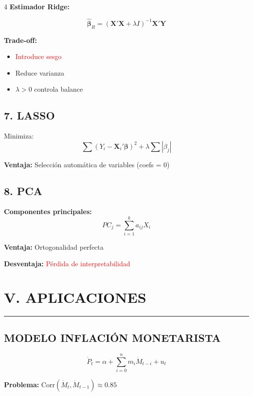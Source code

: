 \documentclass[6pt, landscape]{extarticle}
\newcommand{\sectionline}{%
  \nopagebreak\vspace{-4pt}\noindent\textcolor{GoldLeaf}{\rule{\linewidth}{1pt}}\par\vspace{2pt}%
}
\newcommand{\Xmat}{\mathbf{X}}
\newcommand{\Ymat}{\mathbf{Y}}
\newcommand{\betahat}{\hat{\boldsymbol{\beta}}}
\begin{document}
\begin{multicols*}{4}
\textbf{Estimador Ridge:}
\begin{formulabox}
\vspace{-3pt}
$$\betahat_R = (\Xmat'\Xmat + \lambda I)^{-1}\Xmat'\Ymat$$
\vspace{-3pt}
\end{formulabox}

\textbf{Trade-off:}
\begin{itemize}
    \item \textcolor{red}{Introduce sesgo}
    \item \textcolor{OliveGreen}{Reduce varianza}
    \item $\lambda > 0$ controla balance
\end{itemize}

\subsection{7. LASSO}

Minimiza:
$$\sum (Y_i - \Xmat_i'\boldsymbol{\beta})^2 + \lambda \sum |\beta_j|$$

\textbf{Ventaja:} Selección automática de variables (coefs = 0)

\subsection{8. PCA}

\textbf{Componentes principales:}
$$PC_j = \sum_{i=1}^k a_{ij} X_i$$

\textbf{Ventaja:} Ortogonalidad perfecta

\textbf{Desventaja:} \textcolor{red}{Pérdida de interpretabilidad}

\section{V. APLICACIONES}
\sectionline

\subsection{MODELO INFLACIÓN MONETARISTA}

\begin{formulabox}
\vspace{-3pt}
$$\dot{P}_t = \alpha + \sum_{i=0}^n m_i \dot{M}_{t-i} + u_t$$
\vspace{-3pt}
\end{formulabox}

\textbf{Problema:} $\text{Corr}(\dot{M}_t, \dot{M}_{t-1}) \approx 0.85$


\end{multicols*}
\end{document}
